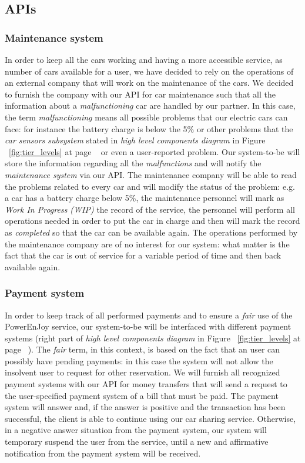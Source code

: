 \documentclass[10pt, a4paper,titlepage]{article}
\begin{document}
\subsection{APIs}
\subsubsection{Maintenance system}
In order to keep all the cars working and having a more accessible service, as number of cars available for a user, we have decided to rely on the operations of an external company that will work on the maintenance of the cars. We decided to furnish the company with our API for car maintenance such that all the information about a \emph{malfunctioning} car are handled by our partner. In this case, the term \emph{malfunctioning} means all possible problems that our electric cars can face: for instance the battery charge is below the 5\% or other problems that the \emph{car sensors subsystem} stated in \emph{high level components diagram} in Figure ~\ref{fig:tier_levels} at page ~\pageref{fig:tier_levels} or even a user-reported problem. Our system-to-be will store the information regarding all the \emph{malfunctions} and will notify the \emph{maintenance system} via our API. The maintenance company will be able to read the problems related to every car and will modify the status of the problem: e.g. a car has a battery charge below 5\%, the maintenance personnel will mark as \emph{Work In Progress (WIP)} the record of the service, the personnel will perform all operations needed in order to put the car in charge and then will mark the record as \emph{completed} so that the car can be available again. The operations performed by the maintenance company are of no interest for our system: what matter is the fact that the car is out of service for a variable period of time and then back available again.
\subsubsection{Payment system}
In order to keep track of all performed payments and to ensure a \emph{fair} use of the PowerEnJoy service, our system-to-be will be interfaced with different payment systems (right part of \emph{high level components diagram} in Figure ~\ref{fig:tier_levels} at page ~\pageref{fig:tier_levels}). The \emph{fair} term, in this context, is based on the fact that an user can possibly have pending payments: in this case the system will not allow the insolvent user to request for other reservation. We will furnish all recognized payment systems with our API for money transfers that will send a request to the user-specified payment system of a bill that must be paid. The payment system will answer and, if the answer is positive and the transaction has been successful, the client is able to continue using our car sharing service. Otherwise, in a negative answer situation from the payment system, our system will temporary suspend the user from the service, until a new and affirmative notification from the payment system will be received. 
\end{document}
